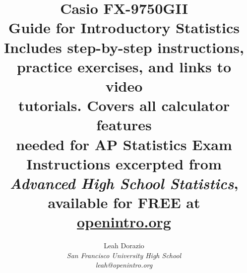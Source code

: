 
\title{\huge Casio FX-9750GII\\Guide for Introductory Statistics\vspace{10mm} \\ \Large Includes step-by-step instructions, \\practice exercises, and links to video \\tutorials.  Covers all calculator features \\needed for AP\textregistered{}  Statistics Exam \vspace{10mm} \\ \Large Instructions excerpted from \\ \emph{Advanced High School Statistics}, \\available for FREE at \href{https://www.openintro.org/stat/textbook.php?stat_book=aps}{openintro.org} \vspace{20mm}}
\author{
Leah Dorazio \\
\small\emph{San Francisco University High School} \\
\small\emph{leah@openintro.org}}
